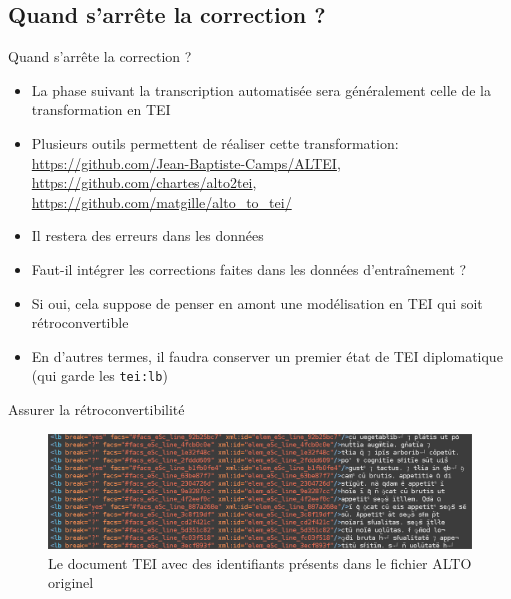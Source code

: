 \documentclass[11pt,aspectratio=169]{beamer}
\begin{document}
\subsection{Quand s'arrête la correction ?}
\begin{frame}{Quand s'arrête la correction ?}
\begin{center}
\begin{itemize}
\item La phase suivant la transcription automatisée sera généralement celle de la transformation en TEI
\item Plusieurs outils permettent de réaliser cette transformation: \url{https://github.com/Jean-Baptiste-Camps/ALTEI}, \url{https://github.com/chartes/alto2tei}, \url{https://github.com/matgille/alto_to_tei/}
\item Il restera des erreurs dans les données
\item Faut-il intégrer les corrections faites dans les données d'entraînement ? 
\item Si oui, cela suppose de penser en amont une modélisation en TEI qui soit rétroconvertible
\item En d'autres termes, il faudra conserver un premier état de TEI diplomatique (qui garde les \texttt{tei:lb})
\end{itemize}
\end{center}
\end{frame}


\begin{frame}{Assurer la rétroconvertibilité}
\begin{center}
\begin{figure}
\includegraphics[width=1\textwidth]{img/tei_retroconvertible.png}
\caption{Le document TEI avec des identifiants présents dans le fichier ALTO originel}
\end{figure}
\end{center}

\end{frame}
\end{document}
